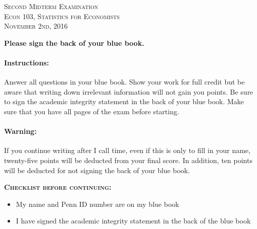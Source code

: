 \documentclass[addpoints,12pt]{exam}
\begin{document}
\begin{center}
	\textsc{\large Second Midterm Examination\\ 
					  \normalsize Econ 103, Statistics for Economists \\ 
					  \vspace{0.5em} 
					  November 2nd, 2016}
	
	\vspace{2em}
\end{center}

\begin{center}
        
        \vspace{2em}
        \textbf{Please sign the back of your blue book.}
\end{center}

\begin{center}
\combinedgradetable[h][questions]
\end{center}

\paragraph{Instructions:} Answer all questions in your blue book. Show your work for full credit but be aware that writing down irrelevant information will not gain you points. Be sure to sign the academic integrity statement in the back of your blue book. Make sure that you have all pages of the exam before starting.

\paragraph{Warning:} If you continue writing after I call time, even if this is only to fill in your name, twenty-five points will be deducted from your final score. In addition, ten points will be deducted for not signing the back of your blue book.

\vspace{1em}
\textsc{\textbf{Checklist before continuing:}}
\begin{itemize}[label = $\square$, nolistsep]
	\item My name and Penn ID number are on my blue book
	\item I have signed the academic integrity statement in the back of the blue book
\end{itemize}
\end{document}
